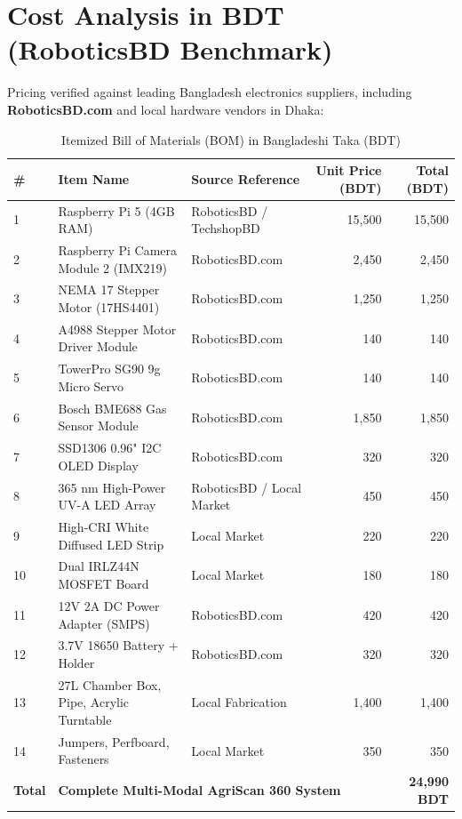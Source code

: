 \documentclass[11pt,a4paper]{article}
\begin{document}
\section{Cost Analysis in BDT (RoboticsBD Benchmark)}
Pricing verified against leading Bangladesh electronics suppliers, including \textbf{RoboticsBD.com} and local hardware vendors in Dhaka:

\begin{table}[H]
\centering
\begin{tabularx}{\textwidth}{l l X r r}
\toprule
\textbf{\#} & \textbf{Item Name} & \textbf{Source Reference} & \textbf{Unit Price (BDT)} & \textbf{Total (BDT)} \\
\midrule
1 & Raspberry Pi 5 (4GB RAM) & RoboticsBD / TechshopBD & 15,500 & 15,500 \\
2 & Raspberry Pi Camera Module 2 (IMX219) & RoboticsBD.com & 2,450 & 2,450 \\
3 & NEMA 17 Stepper Motor (17HS4401) & RoboticsBD.com & 1,250 & 1,250 \\
4 & A4988 Stepper Motor Driver Module & RoboticsBD.com & 140 & 140 \\
5 & TowerPro SG90 9g Micro Servo & RoboticsBD.com & 140 & 140 \\
6 & Bosch BME688 Gas Sensor Module & RoboticsBD.com & 1,850 & 1,850 \\
7 & SSD1306 0.96" I2C OLED Display & RoboticsBD.com & 320 & 320 \\
8 & 365 nm High-Power UV-A LED Array & RoboticsBD / Local Market & 450 & 450 \\
9 & High-CRI White Diffused LED Strip & Local Market & 220 & 220 \\
10 & Dual IRLZ44N MOSFET Board & Local Market & 180 & 180 \\
11 & 12V 2A DC Power Adapter (SMPS) & RoboticsBD.com & 420 & 420 \\
12 & 3.7V 18650 Battery + Holder & RoboticsBD.com & 320 & 320 \\
13 & 27L Chamber Box, Pipe, Acrylic Turntable & Local Fabrication & 1,400 & 1,400 \\
14 & Jumpers, Perfboard, Fasteners & Local Market & 350 & 350 \\
\midrule
\textbf{Total} & \multicolumn{3}{l}{\textbf{Complete Multi-Modal AgriScan 360 System}} & \textbf{24,990 BDT} \\
\bottomrule
\end{tabularx}
\caption{Itemized Bill of Materials (BOM) in Bangladeshi Taka (BDT)}
\end{table}
\end{document}
